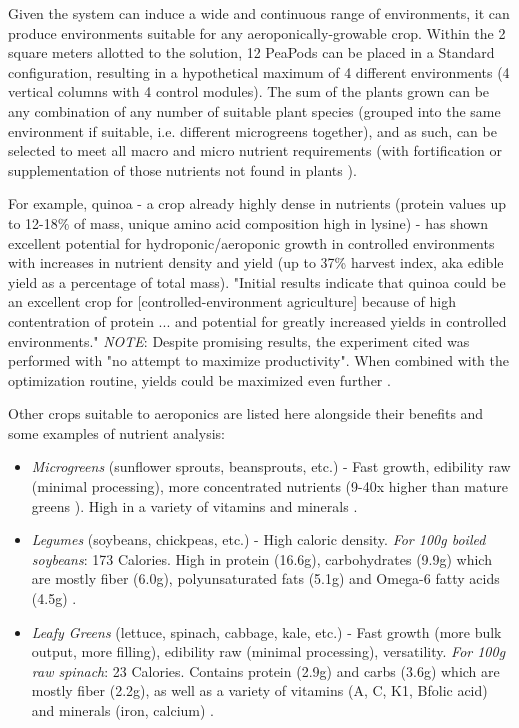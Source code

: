 \documentclass{report}
\begin{document}

Given the system can induce a wide and continuous range of environments, it can produce environments suitable for any aeroponically-growable crop. Within the 2 square meters allotted to the solution, 12 PeaPods can be placed in a Standard configuration, resulting in a hypothetical maximum of 4 different environments (4 vertical columns with 4 control modules). The sum of the plants grown can be any combination of any number of suitable plant species (grouped into the same environment if suitable, i.e. different microgreens together), and as such, can be selected to meet all macro and micro nutrient requirements (with fortification or supplementation of those nutrients not found in plants \cite{plantbased}). 

For example, quinoa - a crop already highly dense in nutrients (protein values up to 12-18\% of mass, unique amino acid composition high in lysine) - has shown excellent potential for hydroponic/aeroponic growth in controlled environments with increases in nutrient density and yield (up to 37\% harvest index, aka edible yield as a percentage of total mass). "Initial results indicate that quinoa could be an excellent crop for [controlled-environment agriculture] because of high contentration of protein ... and potential for greatly increased yields in controlled environments." \textit{NOTE}: Despite promising results, the experiment cited was performed with "no attempt to maximize productivity". When combined with the optimization routine, yields could be maximized even further \cite{quinoa}.

Other crops suitable to aeroponics are listed here alongside their benefits and some examples of nutrient analysis:
\begin{itemize}
    \item \textit{Microgreens} (sunflower sprouts, beansprouts, etc.) - Fast growth, edibility raw (minimal processing), more concentrated nutrients (9-40x higher than mature greens \cite{microgreens2}). High in a variety of vitamins and minerals \cite{microgreens1}.
    \item \textit{Legumes} (soybeans, chickpeas, etc.) - High caloric density. \textit{For 100g boiled soybeans}: 173 Calories. High in protein (16.6g), carbohydrates (9.9g) which are mostly fiber (6.0g), polyunsaturated fats (5.1g) and Omega-6 fatty acids (4.5g) \cite{soybeans}.
    \item \textit{Leafy Greens} (lettuce, spinach, cabbage, kale, etc.) - Fast growth (more bulk output, more filling), edibility raw (minimal processing), versatility. \textit{For 100g raw spinach}: 23 Calories. Contains protein (2.9g) and carbs (3.6g) which are mostly fiber (2.2g), as well as a variety of vitamins (A, C, K1, Bfolic acid) and minerals (iron, calcium) \cite{spinach}. 
\end{itemize}
\end{document}
